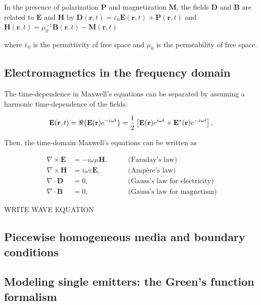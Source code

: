 In the presence of polarization $\mathbf{P}$ and magnetization $\mathbf{M}$, the fields $\mathbf{D}$ and $\mathbf{B}$ are related to $\mathbf{E}$ and $\mathbf{H}$ by $\mathbf{D}(\mathbf{r}, t) = \varepsilon_0 \mathbf{E}(\mathbf{r}, t) + \mathbf{P}(\mathbf{r}, t)$ and $\mathbf{H}(\mathbf{r}, t) = \mu_0^{-1} \mathbf{B}(\mathbf{r}, t) - \mathbf{M}(\mathbf{r}, t)$

where $\varepsilon_0$ is the permittivity of free space and $\mu_0$ is the permeability of free space.


\subsection*{Electromagnetics in the frequency domain}

The time-dependence in Maxwell's equations can be separated by assuming a harmonic time-dependence of the fields:

\begin{equation}
    \mathbf{E}(\mathbf{r}, t) = \Re \{ \mathbf{E}(\mathbf{r}) e^{-i\omega t} \} = \frac{1}{2}\left[ \mathbf{E}(\mathbf{r}) e^{i\omega t} + \mathbf{E}^*(\mathbf{r}) e^{-i\omega t}\right], \label{eq:E_harmonic}\\
\end{equation}

Then, the time-domain Maxwell's equations can be written as

\begin{align}
    \nabla \times \mathbf{E} &= -i\omega \mu \mathbf{H}, \quad \quad &\text{(Faraday's law)} \label{eq:curlE_freq}\\
    \nabla \times \mathbf{H} &= i\omega \varepsilon \mathbf{E}, \quad \quad &\text{(Ampère's law)} \label{eq:curlH_freq}\\
    \nabla \cdot \mathbf{D} &= 0, \quad \quad &\text{(Gauss's law for electricity)} \label{eq:divD_freq}\\
    \nabla \cdot \mathbf{B} &= 0, \quad \quad &\text{(Gauss's law for magnetism)} \label{eq:divB_freq}
\end{align}

WRITE WAVE EQUATION

\subsection*{Piecewise homogeneous media and boundary conditions}

\subsection*{Modeling single emitters: the Green's function formalism}

